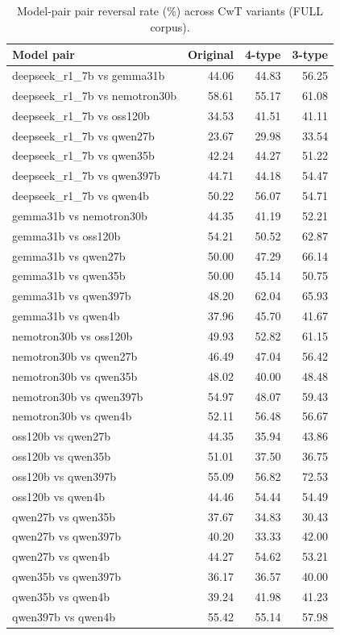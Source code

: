 \begin{table}[htbp]
\centering\small
\caption{Model-pair pair reversal rate (\%) across CwT variants (FULL corpus).}
\label{tab:phase1h_modelpair_full}
\begin{tabular}{lrrr}
\toprule
Model pair & Original & 4-type & 3-type \\
\midrule
  deepseek_r1_7b vs gemma31b & 44.06 & 44.83 & 56.25 \\
  deepseek_r1_7b vs nemotron30b & 58.61 & 55.17 & 61.08 \\
  deepseek_r1_7b vs oss120b & 34.53 & 41.51 & 41.11 \\
  deepseek_r1_7b vs qwen27b & 23.67 & 29.98 & 33.54 \\
  deepseek_r1_7b vs qwen35b & 42.24 & 44.27 & 51.22 \\
  deepseek_r1_7b vs qwen397b & 44.71 & 44.18 & 54.47 \\
  deepseek_r1_7b vs qwen4b & 50.22 & 56.07 & 54.71 \\
  gemma31b vs nemotron30b & 44.35 & 41.19 & 52.21 \\
  gemma31b vs oss120b & 54.21 & 50.52 & 62.87 \\
  gemma31b vs qwen27b & 50.00 & 47.29 & 66.14 \\
  gemma31b vs qwen35b & 50.00 & 45.14 & 50.75 \\
  gemma31b vs qwen397b & 48.20 & 62.04 & 65.93 \\
  gemma31b vs qwen4b & 37.96 & 45.70 & 41.67 \\
  nemotron30b vs oss120b & 49.93 & 52.82 & 61.15 \\
  nemotron30b vs qwen27b & 46.49 & 47.04 & 56.42 \\
  nemotron30b vs qwen35b & 48.02 & 40.00 & 48.48 \\
  nemotron30b vs qwen397b & 54.97 & 48.07 & 59.43 \\
  nemotron30b vs qwen4b & 52.11 & 56.48 & 56.67 \\
  oss120b vs qwen27b & 44.35 & 35.94 & 43.86 \\
  oss120b vs qwen35b & 51.01 & 37.50 & 36.75 \\
  oss120b vs qwen397b & 55.09 & 56.82 & 72.53 \\
  oss120b vs qwen4b & 44.46 & 54.44 & 54.49 \\
  qwen27b vs qwen35b & 37.67 & 34.83 & 30.43 \\
  qwen27b vs qwen397b & 40.20 & 33.33 & 42.00 \\
  qwen27b vs qwen4b & 44.27 & 54.62 & 53.21 \\
  qwen35b vs qwen397b & 36.17 & 36.57 & 40.00 \\
  qwen35b vs qwen4b & 39.24 & 41.98 & 41.23 \\
  qwen397b vs qwen4b & 55.42 & 55.14 & 57.98 \\
\bottomrule
\end{tabular}
\end{table}

